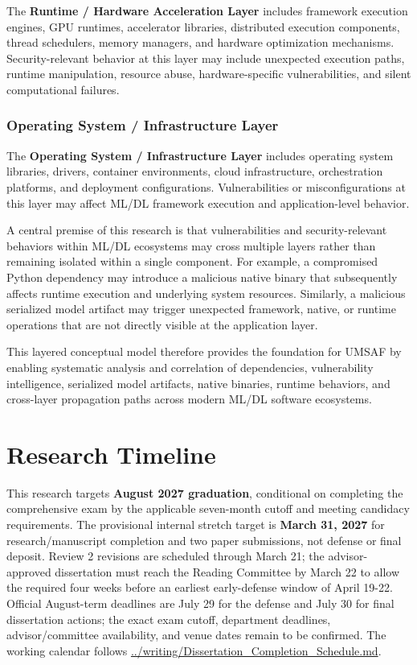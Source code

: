 \documentclass[
  12pt,
  letterpaper,
  oneside]{report}
\begin{document}
The \textbf{Runtime / Hardware Acceleration Layer} includes framework
execution engines, GPU runtimes, accelerator libraries, distributed
execution components, thread schedulers, memory managers, and hardware
optimization mechanisms. Security-relevant behavior at this layer may
include unexpected execution paths, runtime manipulation, resource
abuse, hardware-specific vulnerabilities, and silent computational
failures.

\subsection{Operating System / Infrastructure
Layer}\label{operating-system--infrastructure-layer}

The \textbf{Operating System / Infrastructure Layer} includes operating
system libraries, drivers, container environments, cloud infrastructure,
orchestration platforms, and deployment configurations. Vulnerabilities
or misconfigurations at this layer may affect ML/DL framework execution
and application-level behavior.

A central premise of this research is that vulnerabilities and
security-relevant behaviors within ML/DL ecosystems may cross multiple
layers rather than remaining isolated within a single component. For
example, a compromised Python dependency may introduce a malicious
native binary that subsequently affects runtime execution and underlying
system resources. Similarly, a malicious serialized model artifact may
trigger unexpected framework, native, or runtime operations that are not
directly visible at the application layer.

This layered conceptual model therefore provides the foundation for
UMSAF by enabling systematic analysis and correlation of dependencies,
vulnerability intelligence, serialized model artifacts, native binaries,
runtime behaviors, and cross-layer propagation paths across modern ML/DL
software ecosystems.

\chapter{Research Timeline}\label{7-research-timeline}

This research targets \textbf{August 2027 graduation}, conditional on
completing the comprehensive exam by the applicable seven-month cutoff
and meeting candidacy requirements. The provisional internal stretch
target is \textbf{March 31, 2027} for research/manuscript completion and
two paper submissions, not defense or final deposit. Review 2 revisions
are scheduled through March 21; the advisor-approved dissertation must
reach the Reading Committee by March 22 to allow the required four weeks
before an earliest early-defense window of April 19-22. Official
August-term deadlines are July 29 for the defense and July 30 for final
dissertation actions; the exact exam cutoff, department deadlines,
advisor/committee availability, and venue dates remain to be confirmed.
The working calendar follows
\url{../writing/Dissertation_Completion_Schedule.md}.
\end{document}
